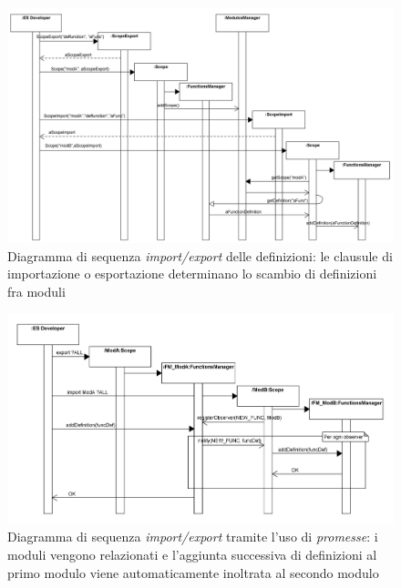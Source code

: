 \begin{figure}
\centering
\includegraphics[width=1.2\textwidth, angle=270]{Immagini/Capitolo3/Sequenza/myclips_Scope_ImportExport.png}
\caption[Diagramma di sequenza \emph{import/export} delle definizioni]{Diagramma di sequenza \emph{import/export} delle definizioni: le clausule di importazione o esportazione determinano lo scambio di definizioni fra moduli}\label{fig:sequence-def-import-export}
\end{figure}

\begin{figure}
\centering
\includegraphics[width=1.3\textwidth, angle=270]{Immagini/Capitolo3/Sequenza/myclips_Scope_ExportPromise.png}
\caption[Diagramma di sequenza \emph{import/export} tramite l'uso di \emph{promesse}]{Diagramma di sequenza \emph{import/export} tramite l'uso di \emph{promesse}: i moduli vengono relazionati e l'aggiunta successiva di definizioni al primo modulo viene automaticamente inoltrata al secondo modulo}\label{fig:sequence-def-import-export-promise}
\end{figure}

